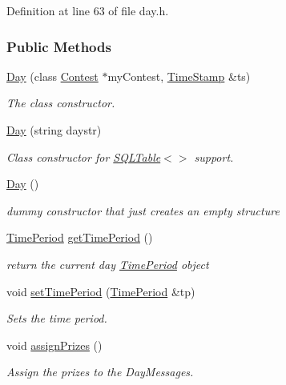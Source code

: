 Definition at line 63 of file day.h.\subsubsection*{Public Methods}
\begin{CompactItemize}
\item 
\hyperlink{classDay_Daya0}{Day} (class \hyperlink{classContest}{Contest} $\ast$my\-Contest, \hyperlink{classTimeStamp}{Time\-Stamp} \&ts)
\begin{CompactList}\small\item\em The class constructor.\item\end{CompactList}\item 
\hyperlink{classDay_Daya1}{Day} (string daystr)
\begin{CompactList}\small\item\em Class constructor for \hyperlink{classSQLTable}{SQLTable}$<$$>$ support.\item\end{CompactList}\item 
\hyperlink{classDay_Daya2}{Day} ()
\begin{CompactList}\small\item\em dummy constructor that just creates an empty structure\item\end{CompactList}\item 
\hyperlink{classTimePeriod}{Time\-Period} \hyperlink{classDay_Daya3}{get\-Time\-Period} ()
\begin{CompactList}\small\item\em return the current day \hyperlink{classTimePeriod}{Time\-Period} object\item\end{CompactList}\item 
void \hyperlink{classDay_Daya4}{set\-Time\-Period} (\hyperlink{classTimePeriod}{Time\-Period} \&tp)
\begin{CompactList}\small\item\em Sets the time period.\item\end{CompactList}\item 
void \hyperlink{classDay_Daya5}{assign\-Prizes} ()
\begin{CompactList}\small\item\em Assign the prizes to the Day\-Messages.\item\end{CompactList}\item 

\end{CompactItemize}

